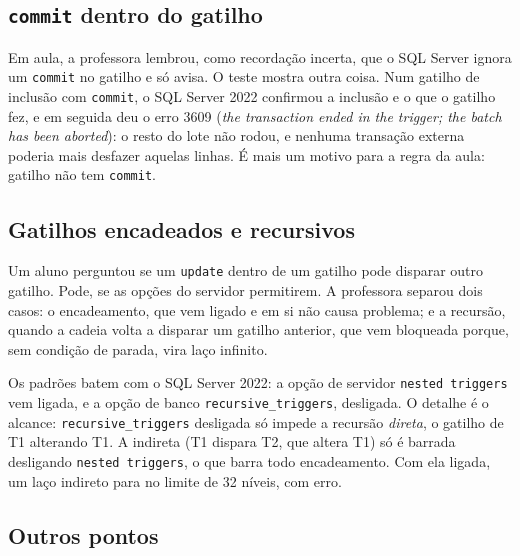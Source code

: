 \subsection*{\texttt{commit} dentro do gatilho}

Em aula, a professora lembrou, como recordação incerta, que o SQL Server
ignora um \texttt{commit} no gatilho e só avisa. O teste mostra outra
coisa. Num gatilho de inclusão com \texttt{commit}, o SQL Server 2022
confirmou a inclusão e o que o gatilho fez, e em seguida deu o erro 3609
(\emph{the transaction ended in the trigger; the batch has been
aborted}): o resto do lote não rodou, e nenhuma transação externa
poderia mais desfazer aquelas linhas. É mais um motivo para a regra da
aula: gatilho não tem \texttt{commit}.

\subsection*{Gatilhos encadeados e recursivos}

Um aluno perguntou se um \texttt{update} dentro de um gatilho pode
disparar outro gatilho. Pode, se as opções do servidor permitirem. A
professora separou dois casos: o encadeamento, que vem ligado e em si não
causa problema; e a recursão, quando a cadeia volta a disparar um
gatilho anterior, que vem bloqueada porque, sem condição de parada, vira
laço infinito.

Os padrões batem com o SQL Server 2022: a opção de servidor
\texttt{nested triggers} vem ligada, e a opção de banco
\texttt{recursive\_triggers}, desligada. O
detalhe é o alcance: \texttt{recursive\_triggers} desligada só impede a
recursão \emph{direta}, o gatilho de T1 alterando T1. A indireta (T1
dispara T2, que altera T1) só é barrada desligando \texttt{nested
triggers}, o que barra todo encadeamento. Com ela ligada, um laço
indireto para no limite de 32 níveis, com erro.

\subsection*{Outros pontos}

